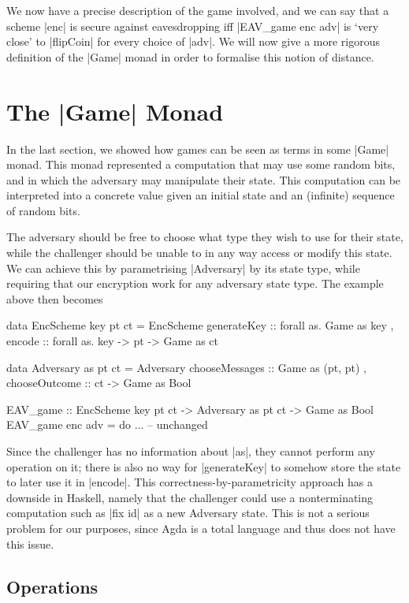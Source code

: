 We now have a precise description of the game involved, and we can say that a scheme |enc| is secure against
eavesdropping iff |EAV_game enc adv| is `very close' to |flipCoin| for every choice of |adv|.  We will now give a more
rigorous definition of the |Game| monad in order to formalise this notion of distance.

\section{The |Game| Monad}

In the last section, we showed how games can be seen as terms in some |Game| monad.  This monad represented a
computation that may use some random bits, and in which the adversary may manipulate their state.  This computation can
be interpreted into a concrete value given an initial state and an (infinite) sequence of random bits.

The adversary should be free to choose what type they wish to use for their state, while the challenger should be unable
to in any way access or modify this state.  We can achieve this by parametrising |Adversary| by its state type, while
requiring that our encryption work for any adversary state type.  The example above then becomes
\begin{code}
data EncScheme key pt ct = EncScheme
                         { generateKey :: forall as. Game as key
                         , encode :: forall as. key -> pt -> Game as ct
                         }

data Adversary as pt ct = Adversary
                        { chooseMessages :: Game as (pt, pt)
                        , chooseOutcome :: ct -> Game as Bool
                        }

EAV_game :: EncScheme key pt ct -> Adversary as pt ct -> Game as Bool
EAV_game enc adv = do
    ... -- unchanged
\end{code}

Since the challenger has no information about |as|, they cannot perform any operation on it; there is also no way for
|generateKey| to somehow store the state to later use it in |encode|.  This correctness-by-parametricity approach has a
downside in Haskell, namely that the challenger could use a nonterminating computation such as |fix id| as a new
Adversary state.  This is not a serious problem for our purposes, since Agda is a total language and thus does not have
this issue.

\subsection{Operations}


